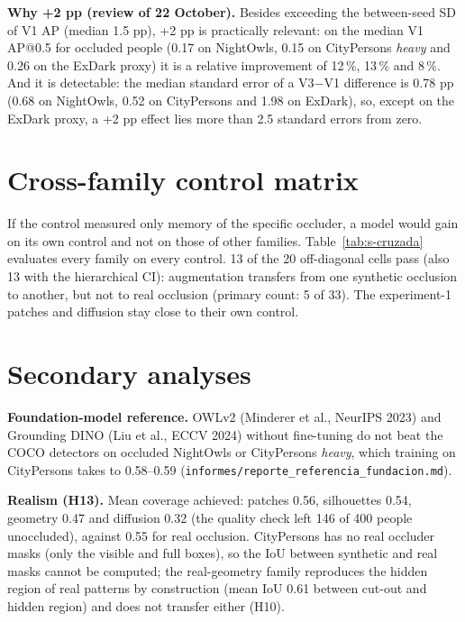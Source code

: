 \documentclass[10pt]{article}
\begin{document}


\noindent\textbf{Why +2 pp (review of 22 October).} Besides exceeding the between-seed SD of V1 AP (median 1.5 pp), +2 pp is practically relevant: on the median V1 AP@0.5 for occluded people (0.17 on NightOwls, 0.15 on CityPersons \emph{heavy} and 0.26 on the ExDark proxy) it is a relative improvement of 12\,\%, 13\,\% and 8\,\%. And it is detectable: the median standard error of a V3$-$V1 difference is 0.78 pp (0.68 on NightOwls, 0.52 on CityPersons and 1.98 on ExDark), so, except on the ExDark proxy, a +2 pp effect lies more than 2.5 standard errors from zero.

\section{Cross-family control matrix}
If the control measured only memory of the specific occluder, a model would gain on its own control and not on those of other families. Table~\ref{tab:s-cruzada} evaluates every family on every control. 13 of the 20 off-diagonal cells pass (also 13 with the hierarchical CI): augmentation transfers from one synthetic occlusion to another, but not to real occlusion (primary count: 5 of 33). The experiment-1 patches and diffusion stay close to their own control.



\section{Secondary analyses}




\noindent\textbf{Foundation-model reference.} OWLv2 (Minderer et al., NeurIPS 2023) and Grounding DINO (Liu et al., ECCV 2024) without fine-tuning do not beat the COCO detectors on occluded NightOwls or CityPersons \emph{heavy}, which training on CityPersons takes to 0.58--0.59 (\texttt{informes/reporte\_referencia\_fundacion.md}).

\noindent\textbf{Realism (H13).} Mean coverage achieved: patches 0.56, silhouettes 0.54, geometry 0.47 and diffusion 0.32 (the quality check left 146 of 400 people unoccluded), against 0.55 for real occlusion. CityPersons has no real occluder masks (only the visible and full boxes), so the IoU between synthetic and real masks cannot be computed; the real-geometry family reproduces the hidden region of real patterns by construction (mean IoU 0.61 between cut-out and hidden region) and does not transfer either (H10).
\end{document}
